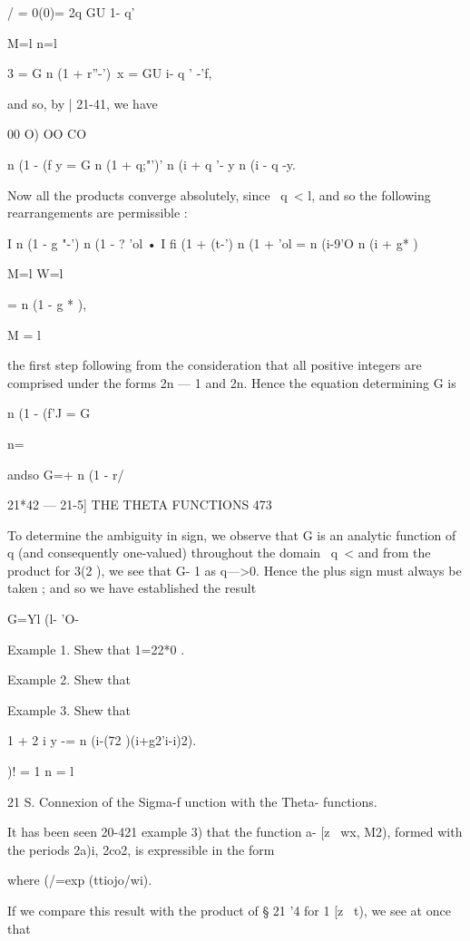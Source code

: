  / = 0(0)= 2q GU 1- q' %

M=l n=l

 3 = G n (1 + r''-')\ x = GU i- q ' -'f,

and so, by | 21-41, we have

00 O) OO CO

n (1 - (f y = G n (1 + q;"')' n (i + q '- y n (i - q -y.

Now all the products converge absolutely, since \ q\ < l, and so the
following rearrangements are permissible :

I n (1 - g "-') n (1 - ? 'ol • I fi (1 + (t-') n (1 + 'ol = n (i-9'O n
(i + g* )

M=l W=l

= n (1 - g * ),

M = l

the first step following from the consideration that all positive
integers are comprised under the forms 2n — 1 and 2n. Hence the
equation determining G is

n (1 - (f'J = G\



n=\



andso G=+ n (1 - r/



21*42 — 21-5] THE THETA FUNCTIONS 473

To determine the ambiguity in sign, we observe that G is an analytic
function of q (and consequently one-valued) throughout the domain \ q\
< \; and from the product for 3(2 ), we see that G- 1 as q—>0. Hence
the plus sign must always be taken ; and so we have established the
result

G=Yl (l- 'O-

Example 1. Shew that 1=22*0 .

Example 2. Shew that

Example 3. Shew that

1 + 2 i y -= n (i-(72 )(i+g2'i-i)2).

)! = 1 n = l

21 S. Connexion of the Sigma-f unction with the Theta- functions.

It has been seen 20-421 example 3) that the function a- [z \ wx, M2),
formed with the periods 2a)i, 2co2, is expressible in the form

where (/=exp (ttiojo/wi).

If we compare this result with the product of § 21 '4 for 1 [z \ t),
we see at once that

